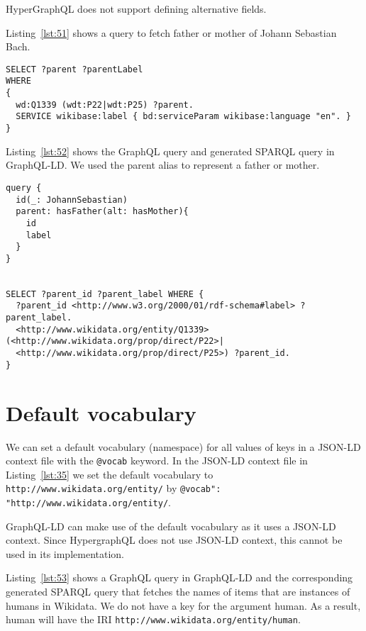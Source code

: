 HyperGraphQL does not support defining alternative fields.

Listing~\ref{lst:51} shows a query to fetch father or mother of Johann Sebastian Bach.


\begin{minipage}{\linewidth}
\begin{lstlisting}[columns=fullflexible, label=lst:51, caption={SPARQL query showing the usage of alternative paths}, language=SPARQL]
SELECT ?parent ?parentLabel
WHERE
{
  wd:Q1339 (wdt:P22|wdt:P25) ?parent.
  SERVICE wikibase:label { bd:serviceParam wikibase:language "en". }
}
\end{lstlisting}
\end{minipage}

Listing~\ref{lst:52} shows the GraphQL query and generated SPARQL query in GraphQL-LD. We used the parent alias to represent a father or mother.

\begin{minipage}{\linewidth}
\begin{lstlisting}[label=lst:52, caption={GraphQL query and generated SPARQL query in GraphQL-LD}, language=SPARQL]
query {
  id(_: JohannSebastian)
  parent: hasFather(alt: hasMother){
    id
    label
  }
}


SELECT ?parent_id ?parent_label WHERE {
  ?parent_id <http://www.w3.org/2000/01/rdf-schema#label> ?parent_label.
  <http://www.wikidata.org/entity/Q1339> (<http://www.wikidata.org/prop/direct/P22>|
  <http://www.wikidata.org/prop/direct/P25>) ?parent_id.
}
\end{lstlisting}
\end{minipage}


\section{Default vocabulary}

We can set a default vocabulary (namespace) for all values of keys in a JSON-LD context file with the \texttt{@vocab} keyword. In the JSON-LD context file in Listing~\ref{lst:35} we set the default vocabulary to \texttt{http://www.wikidata.org/entity/} by \texttt{@vocab": "http://www.wikidata.org/entity/}.

GraphQL-LD can make use of the default vocabulary as it uses a JSON-LD context. Since HypergraphQL does not use JSON-LD context, this cannot be used in its implementation. 

Listing~\ref{lst:53} shows a GraphQL query in GraphQL-LD and the corresponding generated SPARQL query that fetches the names of items that are instances of humans in Wikidata. We do not have a key for the argument human. As a result, human will have the IRI \texttt{http://www.wikidata.org/entity/human}. 


